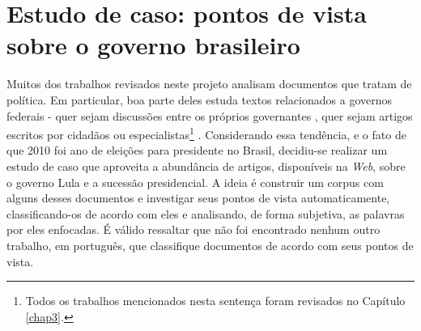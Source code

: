 \chapter{Estudo de caso: pontos de vista sobre o governo brasileiro}
\label{estudo}



Muitos dos trabalhos revisados neste projeto analisam documentos que tratam de política. Em particular, boa parte deles estuda textos relacionados a governos federais - quer sejam discussões entre os próprios governantes \cite{hirst-et-al}, quer sejam artigos escritos por cidadãos ou especialistas\footnote{Todos os trabalhos mencionados nesta sentença foram revisados no Capítulo \ref{chap3}.} \cite{aaai-politics, malouf-taking_sides}. Considerando essa tendência, e o fato de que 2010 foi ano de eleições para presidente no Brasil, decidiu-se realizar um estudo de caso que aproveita a abundância de artigos, disponíveis na \emph{Web}, sobre o governo Lula e a sucessão presidencial. A ideia é construir um corpus com alguns desses documentos e investigar seus pontos de vista automaticamente, classificando-os de acordo com eles e analisando, de forma subjetiva, as palavras por eles enfocadas. É válido ressaltar que não foi encontrado nenhum outro trabalho, em português, que classifique documentos de acordo com seus pontos de vista.

